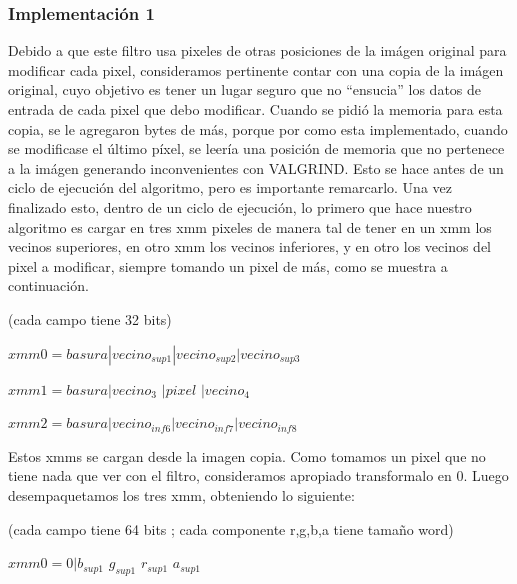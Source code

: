 \documentclass[a4paper]{article}
\begin{document}
\subsubsection{Implementación 1}

Debido a que este filtro usa pixeles de otras posiciones de la imágen original para modificar cada pixel, consideramos pertinente contar con una copia de la imágen original, cuyo objetivo es tener un lugar seguro que no ``ensucia'' los datos de entrada de cada pixel que debo modificar. Cuando se pidió la memoria para esta copia, se le agregaron bytes de más, porque por como esta implementado, cuando se modificase el último píxel, se leería una posición de memoria que no pertenece a la imágen generando inconvenientes con VALGRIND. Esto se hace antes de un ciclo de ejecución del algoritmo, pero es importante remarcarlo. Una vez finalizado esto, dentro de un ciclo de ejecución, lo primero que hace nuestro algoritmo es cargar en tres xmm pixeles de manera tal de tener en un xmm los vecinos superiores, en otro xmm los vecinos inferiores, y en otro los vecinos del pixel a modificar, siempre tomando un pixel de más, como se muestra a continuación.
\vspace*{0.3cm}

(cada campo tiene 32 bits)

$xmm0=  basura|vecino_{sup1}|vecino_{sup2}|vecino_{sup3}$

\vspace*{0.3cm}

$xmm1=  basura|vecino_3$           $|pixel$       $|vecino_4   $

\vspace*{0.3cm}

$xmm2=  basura|vecino_{inf6}|vecino_{inf7}|vecino_{inf8}$

\vspace*{0.3cm}

Estos xmms se cargan desde la imagen copia. Como tomamos un pixel que no tiene nada que ver con el filtro, consideramos apropiado transformalo en 0. Luego desempaquetamos los tres xmm, obteniendo lo siguiente:

\vspace*{0.3cm}

(cada campo tiene 64 bits ; cada componente r,g,b,a tiene tamaño word)

\vspace*{0.3cm}
$xmm0=  0|b_{sup1}$ $g_{sup1}$ $r_{sup1}$ $a_{sup1}$ 

\vspace*{0.3cm}
\end{document}

